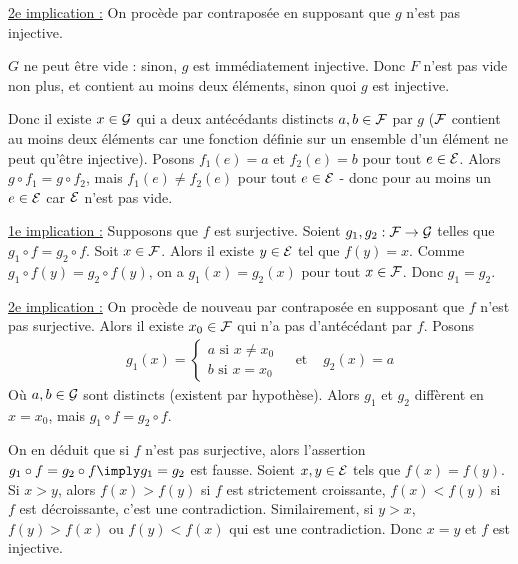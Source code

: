 \documentclass[]{../templates/homework}
\begin{document}
\underline{2e implication :} On procède par contraposée en supposant que $g$ n'est pas injective.

$G$ ne peut être vide : sinon, $g$ est immédiatement injective. Donc $F$ n'est pas vide non plus, et contient au moins deux éléments, sinon quoi $g$ est injective.

Donc il existe $x\in\mathcal G$ qui a deux antécédants distincts $a,b\in\mathcal F$ par $g$ ($\mathcal F$ contient au moins deux éléments car une fonction définie sur un ensemble d'un élément ne peut qu'être injective). Posons $f_{1}(e) = a$ et $f_{2}(e) = b$ pour tout $e\in\mathcal E$. Alors $g\circ f_{1} = g\circ f_{2}$, mais $f_{1}(e) \neq f_{2}(e)$ pour tout $e\in\mathcal E$ - donc pour au moins un $e\in\mathcal E$ car $\mathcal E$ n'est pas vide.

\question
\underline{1e implication :} Supposons que $f$ est surjective. Soient $g_{1},g_{2}: \mathcal F\rightarrow \mathcal G$ telles que $g_{1}\circ f = g_{2}\circ f$. Soit $x \in \mathcal F$. Alors il existe $y\in\mathcal E$ tel que $f(y) = x$. Comme $g_{1}\circ f(y) = g_{2}\circ f(y)$, on a $g_{1}(x) = g_{2}(x)$ pour tout $x\in\mathcal F$. Donc $g_{1} = g_{2}$.

\underline{2e implication :} On procède de nouveau par contraposée en supposant que $f$ n'est pas surjective. Alors il existe $x_{0}\in\mathcal F$ qui n'a pas d'antécédant par $f$. Posons
\begin{eqnarray}
  g_{1}(x) =
  \begin{cases}
    a \text{ si } x\neq x_{0} \\
    b \text{ si } x = x_{0}
  \end{cases}
  &\text{  et  }& g_{2}(x) = a
\end{eqnarray}
Où $a,b \in\mathcal G$ sont distincts (existent par hypothèse). Alors $g_{1}$ et $g_{2}$ diffèrent en $x=x_{0}$, mais $g_{1}\circ f = g_{2}\circ f$.

On en déduit que si $f$ n'est pas surjective, alors l'assertion $g_1 \circ f = g_2 \circ f \imply g_1 = g_2$ est fausse.
\subproblem
Soient $x,y \in \mathcal E$ tels que $f(x) = f(y)$. Si $x>y$, alors $f(x) > f(y)$ si $f$ est strictement croissante, $f(x) < f(y)$ si $f$ est décroissante, c'est une contradiction. Similairement, si $y>x$, $f(y) > f(x)$ ou $f(y) < f(x)$ qui est une contradiction. Donc $x=y$ et $f$ est injective.
\end{document}
